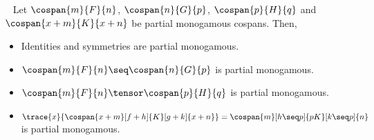 \begin{lemma}~\label{lem:partial monogamous-ops}
    Let \(\cospan{m}{F}{n}\), \(\cospan{n}{G}{p}\), \(\cospan{p}{H}{q}\) and
    \(\cospan{x+m}{K}{x+n}\) be partial monogamous cospans.
    Then,
    \begin{itemize}
        \item Identities and symmetries are partial monogamous.
        \item \(\cospan{m}{F}{n} \seq \cospan{n}{G}{p}\) is partial monogamous.
        \item \(\cospan{m}{F}{n} \tensor \cospan{p}{H}{q}\) is partial
        monogamous.
        \item \(
            \trace{x}{\cospan{x+m}[f+h]{K}[g+k]{x+n}}
            =
            \cospan{m}[h \seq p]{pK}[k \seq p]{n}
        \) is partial monogamous.
    \end{itemize}
\end{lemma}
